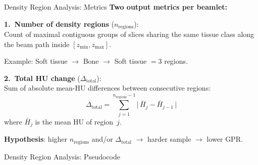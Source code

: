 \documentclass[aspectratio=169, 10pt]{beamer}
\begin{document}
\begin{frame}{Density Region Analysis: Metrics}
  \textbf{Two output metrics per beamlet:}

  \vspace{8pt}
  \textbf{1.\ Number of density regions} ($n_{\text{regions}}$):\\[2pt]
  Count of maximal contiguous groups of slices sharing the same tissue class
  along the beam path inside $[z_{\min}, z_{\max}]$.

  \vspace{4pt}
  {\small Example: Soft tissue $\rightarrow$ Bone $\rightarrow$ Soft tissue
  $= 3$ regions.}

  \vspace{10pt}
  \textbf{2.\ Total HU change} ($\Delta_{\text{total}}$):\\[2pt]
  Sum of absolute mean-HU differences between consecutive regions:
  \begin{equation*}
    \Delta_{\text{total}} = \sum_{j=1}^{n_{\text{regions}}-1}
    \bigl|\, \bar{H}_j - \bar{H}_{j-1} \,\bigr|
  \end{equation*}
  where $\bar{H}_j$ is the mean HU of region~$j$.

  \vspace{8pt}
  \textbf{Hypothesis}: higher $n_{\text{regions}}$ and/or
  $\Delta_{\text{total}}$ $\longrightarrow$ harder sample
  $\longrightarrow$ lower GPR.
\end{frame}

\begin{frame}[fragile]{Density Region Analysis: Pseudocode}
  \vspace{-2pt}
  \begin{center}
  \end{center}
\end{frame}
\end{document}
